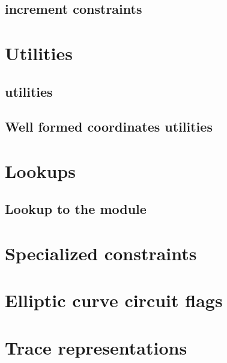 \subsection{\blsId{} increment constraints}                                 \label{bls: stamp increments}                                        

\section{Utilities}                                                                                                                             
\subsection{\wcpMod{} utilities}                                            \label{bls: wcp utilities}                                           
\subsection{Well formed coordinates utilities}                              \label{bls: well formed coordinates utilities}                       
     
\section{Lookups}     
\subsection{Lookup to the \wcpMod{} module}                                 \label{bls: lookups: wcp}                                            
     
\section{Specialized constraints}                                           \label{bls: specialized constraints}                                 
     
\section{Elliptic curve circuit flags}                                      \label{bls: circuits}                                                
     
\newpage     
\section{Trace representations}                                             \label{bls: trace representations}                                   